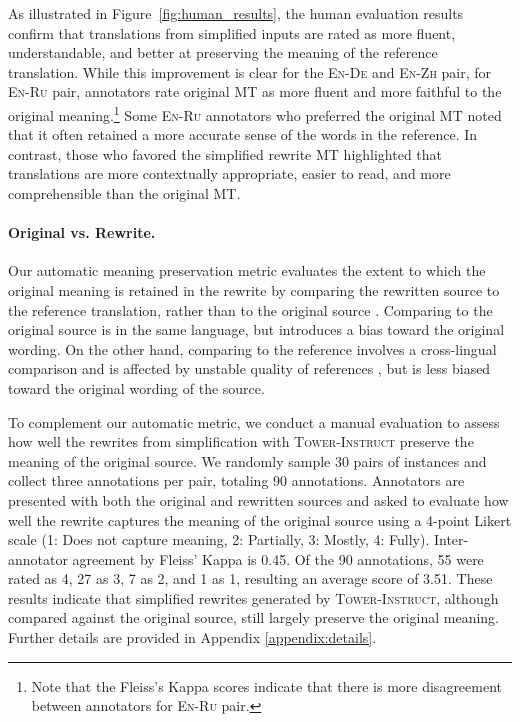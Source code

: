 As illustrated in Figure~\ref{fig:human_results}, the human evaluation results confirm that translations from simplified inputs are rated as more fluent, understandable, and better at preserving the meaning of the reference translation. While this improvement is clear for the \textsc{En-De} and \textsc{En-Zh} pair, for \textsc{En-Ru} pair, annotators rate original MT as more fluent and more faithful to the original meaning.\footnote{Note that the Fleiss's Kappa scores indicate that there is more disagreement between annotators for \textsc{En-Ru} pair.} Some \textsc{En-Ru} annotators who preferred the original MT noted that it often retained a more accurate sense of the words in the reference. In contrast, those who favored the simplified rewrite MT highlighted that translations are more contextually appropriate, easier to read, and more comprehensible than the original MT.


\paragraph{Original vs. Rewrite.}
Our automatic meaning preservation metric evaluates the extent to which the original meaning is retained in the rewrite by comparing the rewritten source to the reference translation, rather than to the original source \citep{Graham2015CanMT}. Comparing to the original source is in the same language, but introduces a bias toward the original wording. On the other hand, comparing to the reference involves a cross-lingual comparison and is affected by unstable quality of references \citep{kocmi-etal-2022-findings}, but is less biased toward the original wording of the source.

To complement our automatic metric, we conduct a manual evaluation to assess how well the rewrites from simplification with \textsc{Tower-Instruct} preserve the meaning of the original source. We randomly sample 30 pairs of instances and collect three annotations per pair, totaling 90 annotations. Annotators are presented with both the original and rewritten sources and asked to evaluate how well the rewrite captures the meaning of the original source using a 4-point Likert scale (1: Does not capture meaning, 2: Partially, 3: Mostly, 4: Fully). Inter-annotator agreement by Fleiss' Kappa is 0.45. Of the 90 annotations, 55 were rated as 4, 27 as 3, 7 as 2, and 1 as 1, resulting an average score of 3.51. These results indicate that simplified rewrites generated by \textsc{Tower-Instruct}, although compared against the original source, still largely preserve the original meaning. Further details are provided in Appendix \ref{appendix:details}.